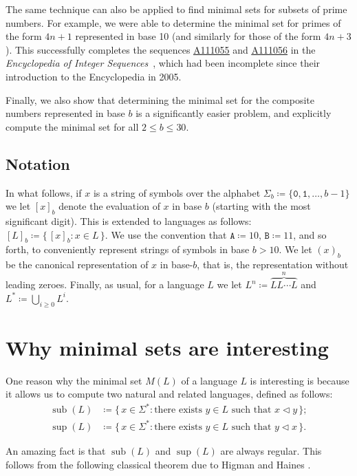 \documentclass[12pt]{article}
\def\subw{\mathrel{\triangleleft}}
\DeclareMathOperator\supe{sup}
\DeclareMathOperator\subb{sub}
\theoremstyle{plain}
\theoremstyle{definition}
\newcommand{\0}{\mathtt{0}}
\newcommand{\1}{\mathtt{1}}
\newcommand{\2}{\mathtt{2}}
\newcommand{\3}{\mathtt{3}}
\newcommand{\4}{\mathtt{4}}
\newcommand{\5}{\mathtt{5}}
\newcommand{\6}{\mathtt{6}}
\newcommand{\7}{\mathtt{7}}
\newcommand{\8}{\mathtt{8}}
\newcommand{\9}{\mathtt{9}}
\newcommand{\A}{\mathtt{A}}
\newcommand{\B}{\mathtt{B}}
\newcommand{\set}[2]{\{\,#1{}:{}#2\,\}}
\newcommand{\seqnum}[1]{\href{http://oeis.org/#1}{\underline{#1}}}
\begin{document}
The same technique can also be applied to find minimal sets for subsets of prime numbers.
For example, we were able to determine the minimal set for primes of the form $4n+1$
represented in base 10 (and similarly for those of the form $4n+3$).
This successfully completes the sequences 
\seqnum{A111055} and \seqnum{A111056} in the 
{\it Encyclopedia of Integer Sequences}~\cite{oeis},
which had been incomplete
since their introduction to the Encyclopedia in 2005.

Finally, we also show that determining the minimal set for
the composite numbers represented in base $b$ is a significantly easier problem,
and explicitly compute the minimal set for all $2\leq b\leq 30$.

\subsection{Notation}

In what follows, if $x$ is a string of symbols over the alphabet
$\Sigma_b \coloneqq \lbrace \0, \1, \dotsc, b-1 \rbrace$ we let 
$[x]_b$ denote the evaluation of $x$ in base $b$ (starting with the
most significant digit).  This is extended to languages as follows:
$[L]_b \coloneqq \set{ [x]_b }{ x \in L }$.
We use the convention that $\A \coloneqq 10$, $\B \coloneqq 11$, and so forth,
to conveniently represent strings of symbols in base $b > 10$.
We let $(x)_b$ be the canonical representation
of $x$ in base-$b$, that is, the representation without leading zeroes.
Finally, as usual, for a language $L$ we let
$L^n \coloneqq \overbrace{LL\dotsm L}^n$ and $L^* \coloneqq \bigcup_{i \geq 0} L^i$.

\section{Why minimal sets are interesting}

One reason why
the minimal set $M(L)$ of a language $L$ is interesting is because it
allows us to compute two natural and related languages,
defined as follows:
\begin{align*}
\subb(L) &\coloneqq \set{x \in \Sigma^*}{\text{there exists $y \in L$ such that $x \subw y$}} ; \\
\supe(L) &\coloneqq \set{x \in \Sigma^*}{\text{there exists $y \in L$ such that $y \subw x$}} .
\end{align*}

An amazing fact is that $\subb(L)$ and $\supe(L)$ are always regular.
This follows from
the following classical theorem due to Higman \cite{Hi52} and
Haines \cite{Ha69}.
\end{document}
